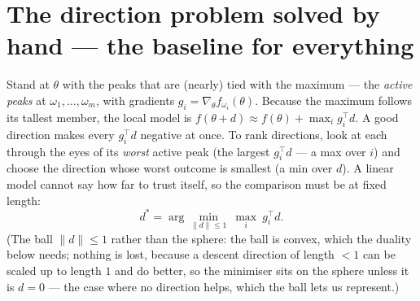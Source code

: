 \documentclass[11pt,a4paper]{article}
\newcommand{\T}{^{\!\top}}
\begin{document}
\section{The direction problem solved by hand --- the baseline for everything}
\label{sec:baseline}

Stand at $\theta$ with the peaks that are (nearly) tied with the maximum --- the
\emph{active peaks} at $\omega_1,\dots,\omega_m$, with gradients $g_i=\nabla_\theta f_{\omega_i}(\theta)$.
Because the maximum follows its tallest member, the local model is
$f(\theta+d)\approx f(\theta)+\max_ig_i\T d$.  A good direction makes every $g_i\T d$
negative at once.  To rank directions, look at each through the eyes of its \emph{worst}
active peak (the largest $g_i\T d$ --- a max over $i$) and choose the direction whose
worst outcome is smallest (a min over $d$).  A linear model cannot say how far to trust
itself, so the comparison must be at fixed length:
\[
d^\ast=\arg\min_{\|d\|\le1}\ \max_{i}\ g_i\T d .
\]
(The ball $\|d\|\le1$ rather than the sphere: the ball is convex, which the duality
below needs; nothing is lost, because a descent direction of length $<1$ can be scaled up
to length $1$ and do better, so the minimiser sits on the sphere unless it is $d=0$ ---
the case where no direction helps, which the ball lets us represent.)
\end{document}
